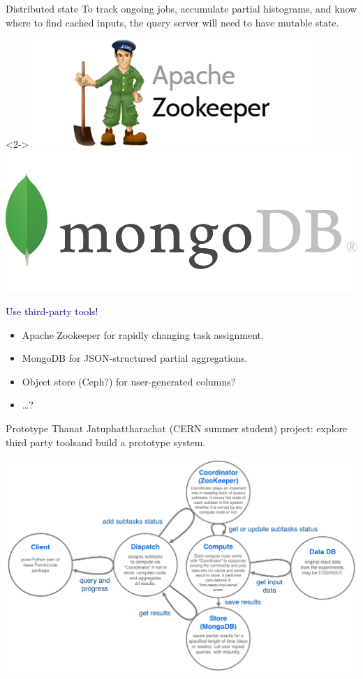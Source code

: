 \documentclass{beamer}
\begin{document}
\begin{frame}{Distributed state}
\vspace{0.5 cm}
To track ongoing jobs, accumulate partial histograms, and know where to find cached inputs, the query server will need to have mutable state.

\vspace{0.3 cm}
\begin{uncoverenv}<2->
\hfill \includegraphics[height=1.2 cm]{zookeeper.png} \includegraphics[height=1.2 cm]{mongodb.png}

\vspace{-0.5 cm}
\textcolor{darkblue}{\large Use third-party tools!}
\begin{itemize}
\item Apache Zookeeper for rapidly changing task assignment.
\item MongoDB for JSON-structured partial aggregations.
\item Object store (Ceph?) for user-generated columns?
\item \ldots?
\end{itemize}
\end{uncoverenv}

\vspace{0.5 cm}
\end{frame}

\begin{frame}{Prototype}
\vspace{0.5 cm}
Thanat Jatuphattharachat (CERN summer student) project: explore third party tools\footnotemark[1] and build a prototype system\footnotemark[2].

\begin{center}
\includegraphics[width=0.75\linewidth]{distributed-layout.png}
\end{center}

\end{frame}
\end{document}
